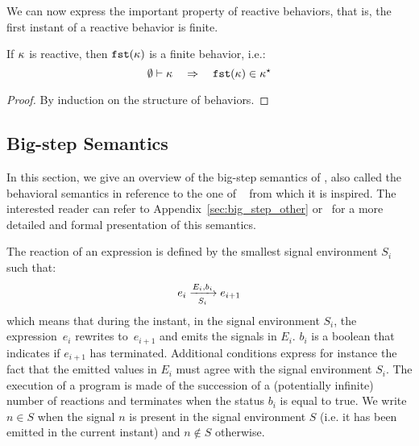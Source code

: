 \documentclass[9pt]{sigplanconf}
\begin{document}
We can now express the important property of reactive behaviors, that is, the first instant of a reactive behavior is finite.
\begin{property}
If $\rk$ is  reactive, then $\rkfst{\rk}$ is a finite behavior, i.e.:
\[ \wf{\emptyset}{\rk} \quad\Rightarrow\quad \rkfinite{\rkfst{\rk}} \]
\end{property}
\begin{proof}
By induction on the structure of behaviors.
\end{proof}

\subsection{Big-step Semantics}
\label{sec:semantics}

In this section, we give an overview of the big-step semantics of \rml{}, also called the behavioral semantics in reference to the one of \esterel~\cite{Berry:1996} from which it is inspired. The interested reader can refer to Appendix~\ref{sec:big_step_other} or~\cite{Mandel:2005} for a more detailed and formal presentation of this semantics.

The reaction of an expression is defined by the smallest signal environment $S_i$ such that:
\[ \bigstep{N}{e_i}{e_{i+1}}{E_i}{b_i}{S_i} \]
which means that during the instant, in the signal environment $S_i$, the expression~$e_i$ rewrites to~$e_{i+1}$ and emits the signals in $E_i$. $b_i$ is a boolean that indicates if $e_{i+1}$ has terminated. Additional conditions express for instance the fact that the emitted values in $E_i$ must agree with the signal environment $S_i$. The execution of a program is made of the succession of a (potentially infinite) number of reactions and terminates when the status $b_i$ is equal to true.
%
We write $n \in S$ when the signal $n$ is present in the signal environment $S$ (i.e. it has been emitted in the current instant) and $n \not\in S$ otherwise.
\end{document}
